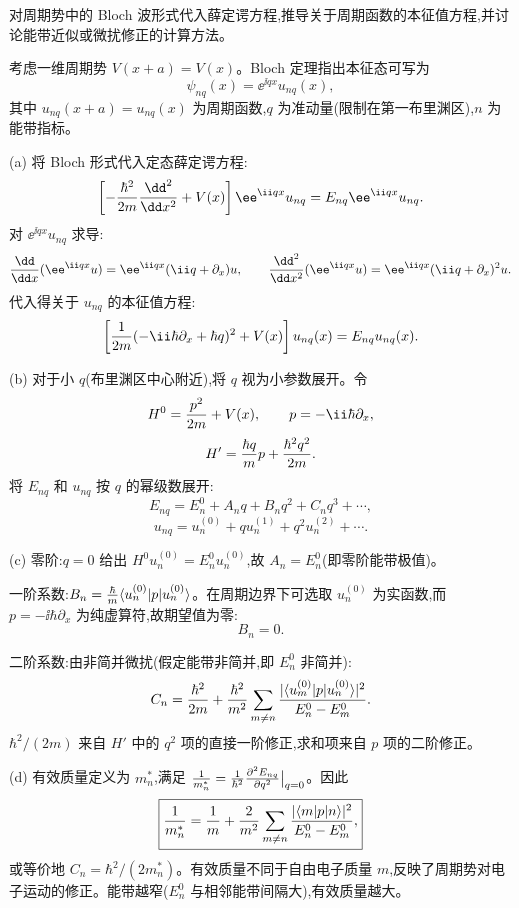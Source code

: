 \begin{question}
对周期势中的 Bloch 波形式代入薛定谔方程,推导关于周期函数的本征值方程,并讨论能带近似或微扰修正的计算方法。
\begin{solution}
考虑一维周期势 $V(x+a)=V(x)$。Bloch 定理指出本征态可写为
\[
\psi_{nq}(x) = \ee^{\ii qx} u_{nq}(x),
\]
其中 $u_{nq}(x+a)=u_{nq}(x)$ 为周期函数,$q$ 为准动量(限制在第一布里渊区),$n$ 为能带指标。

(a) 将 Bloch 形式代入定态薛定谔方程:
\[
\left[-{\hbar^2\over2m}{\dd^2\over\dd x^2} + V(x)\right] \ee^{\ii qx}u_{nq} = E_{nq} \ee^{\ii qx}u_{nq}.
\]
对 $\ee^{\ii qx}u_{nq}$ 求导:
\[
{\dd\over\dd x}(\ee^{\ii qx}u) = \ee^{\ii qx}(\ii q + \partial_x)u,
\qquad
{\dd^2\over\dd x^2}(\ee^{\ii qx}u) = \ee^{\ii qx}(\ii q+\partial_x)^2u.
\]
代入得关于 $u_{nq}$ 的本征值方程:
\[
\left[{1\over2m}(-\ii\hbar\partial_x + \hbar q)^2 + V(x)\right]u_{nq}(x) = E_{nq} u_{nq}(x).
\]

(b) 对于小 $q$(布里渊区中心附近),将 $q$ 视为小参数展开。令
\[
H^0 = {p^2\over2m} + V(x),\qquad p = -\ii\hbar\partial_x,
\]
\[
H' = {\hbar q\over m}p + {\hbar^2 q^2\over2m}.
\]
将 $E_{nq}$ 和 $u_{nq}$ 按 $q$ 的幂级数展开:
\[
E_{nq} = E_n^0 + A_n q + B_n q^2 + C_n q^3 + \cdots,
\]
\[
u_{nq} = u_n^{(0)} + q u_n^{(1)} + q^2 u_n^{(2)} + \cdots.
\]

(c) 零阶:$q=0$ 给出 $H^0 u_n^{(0)} = E_n^0 u_n^{(0)}$,故 $A_n = E_n^0$(即零阶能带极值)。

一阶系数:$B_n = {\hbar\over m}\langle u_n^{(0)}|p|u_n^{(0)}\rangle$。在周期边界下可选取 $u_n^{(0)}$ 为实函数,而 $p=-\ii\hbar\partial_x$ 为纯虚算符,故期望值为零:
\[
B_n = 0.
\]

二阶系数:由非简并微扰(假定能带非简并,即 $E_n^0$ 非简并):
\[
C_n = {\hbar^2\over2m} + {\hbar^2\over m^2}\sum_{m\ne n}{|\langle u_m^{(0)}|p|u_n^{(0)}\rangle|^2\over E_n^0 - E_m^0}.
\]
${\hbar^2/(2m)}$ 来自 $H'$ 中的 $q^2$ 项的直接一阶修正,求和项来自 $p$ 项的二阶修正。

(d) 有效质量定义为 $m_n^*$,满足 ${1\over m_n^*} = {1\over\hbar^2}{\partial^2 E_{nq}\over\partial q^2}\big|_{q=0}$。因此
\[
\boxed{{1\over m_n^*} = {1\over m} + {2\over m^2}\sum_{m\ne n}{|\langle m|p|n\rangle|^2\over E_n^0 - E_m^0},}
\]
或等价地 $\boxed{C_n = \hbar^2/(2m_n^*)}$。有效质量不同于自由电子质量 $m$,反映了周期势对电子运动的修正。能带越窄($E_n^0$ 与相邻能带间隔大),有效质量越大。
\end{solution}
\end{question}
